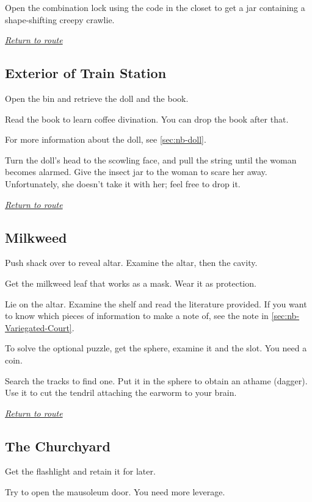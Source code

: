 \documentclass[a5paper]{extarticle}
\begin{document}
Open the combination lock using the code in the closet
to get a jar containing a shape-shifting creepy crawlie.

\hyperref[sec:route]{\emph{Return to route}}

\newpage
\subsection{Exterior of Train Station}\label{sec:sol-Exterior-of-Train-Station}

Open the bin and retrieve the doll and the book.

Read the book to learn coffee divination. You can drop the book after that.

For more information about the doll, see \cref{sec:nb-doll}.

Turn the doll's head to the scowling face, and pull the string until the woman becomes alarmed.
Give the insect jar to the woman to scare her away.
Unfortunately, she doesn't take it with her; feel free to drop it.

\hyperref[sec:route]{\emph{Return to route}}

\newpage
\subsection{Milkweed}\label{sec:sol-Milkweed}
Push shack over to reveal altar. Examine the altar, then the cavity.

Get the milkweed leaf that works as a mask. Wear it as protection.

Lie on the altar. Examine the shelf and read the literature provided.
If you want to know which pieces of information to make a note of,
see the note in \cref{sec:nb-Variegated-Court}.

To solve the optional puzzle, get the sphere, examine it and the slot.
You need a coin.

Search the tracks to find one. Put it in the sphere to obtain an athame (dagger).
Use it to cut the tendril attaching the earworm to your brain.

\hyperref[sec:route]{\emph{Return to route}}

\newpage
\subsection{The Churchyard}\label{sec:sol-Churchyard}

Get the flashlight and retain it for later.

Try to open the mausoleum door. You need more leverage.
\end{document}
